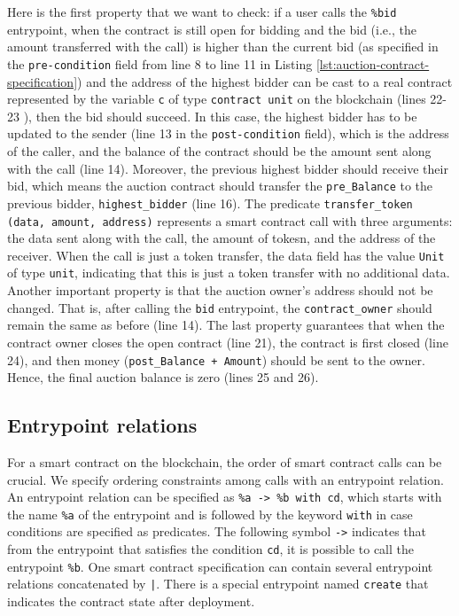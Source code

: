 \documentclass[a4paper,USenglish,cleveref, autoref, thm-restate]{lipics-v2021}
\begin{document}
Here is the first property that we want to check: if a user calls the
\lstinline/%bid/ entrypoint, when the contract is still open for
bidding and the bid (i.e., the amount transferred with the call) is
higher than the current bid (as specified in the
\lstinline/pre-condition/ field from line 8 to line 11 in Listing
\ref{lst:auction-contract-specification}) and the address of the highest bidder can be cast to a real contract represented by the variable \lstinline/c/ of type \lstinline/contract unit/ on the blockchain (lines 22-23 ), then the bid should
succeed.  In this case, the highest bidder has to be updated to the
sender (line 13 in the \lstinline/post-condition/ field), which is the
address of the caller, and the balance of the contract should be the
amount sent along with the call (line 14). Moreover, the previous
highest bidder should receive their bid, which means the auction
contract should transfer the \lstinline/pre_Balance/ to the previous
bidder, \lstinline/highest_bidder/ (line 16). 
The predicate \lstinline/transfer_token (data, amount, address)/
represents a smart contract call with three arguments: the data sent
along with the call, the amount of tokesn, and the address of the
receiver.  When the call is just a token transfer, the data field has
the value \lstinline/Unit/ of type \lstinline/unit/, indicating that
this is just a token transfer with no additional data. Another
important property is that the auction owner's address should not be
changed. That is, after calling the \lstinline/bid/ entrypoint, the
\lstinline/contract_owner/ should remain the same as before (line
14). The last property guarantees that when the contract owner closes the open contract (line 21), the contract is first closed
(line 24), and then money (\lstinline/post_Balance + Amount/) should be sent to the
owner. Hence, the final auction balance is zero (lines 25 and 26).

\subsection{Entrypoint relations}
\label{sec:entrypoint-relations}
For a smart contract on the blockchain, the order of smart contract
calls can be crucial. We specify ordering constraints among calls with
an entrypoint relation. An entrypoint relation can be specified as
\lstinline/%a -> %b with cd/, which starts with the name
\lstinline/%a/ of the entrypoint and is followed by the keyword
\lstinline/with/ in case conditions are specified as predicates. The
following symbol \lstinline/->/ indicates that from the entrypoint
that satisfies the condition \lstinline/cd/, it is possible  to call
the entrypoint \lstinline/%b/. One smart contract specification can
contain several entrypoint relations concatenated by
\lstinline/|/. There is a special entrypoint named \lstinline/create/
that indicates the contract state after deployment. 
\end{document}
